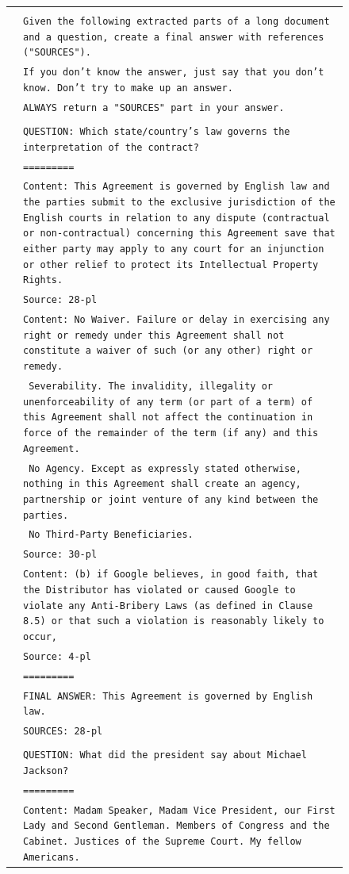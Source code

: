 { %
\newcommand{\pWidth}{5in}
\newcommand{\pStart}{\setcounter{pCount}{1}}
\newcommand{\pRow}[1]{\texttt{\fontsize{6pt}{1pt}\selectfont\color{gray}\arabic{pCount}}&\texttt{\fontsize{6pt}{1pt}\selectfont#1}\stepcounter{pCount}\\}
\newcommand{\pVar}[1]{\textbf{\{#1\}}}
\newcommand{\pBlank}{\_\_\_\_\_}
\begin{figure}[p]
\label{fig:QA_with_sources_prompt}
\begin{center}\scriptsize
\begin{tabular}{|rp{\pWidth}|}\hline\pStart&\\
\pRow{Given the following extracted parts of a long document and a question, create a final answer with references ("SOURCES").}
\pRow{If you don't know the answer, just say that you don't know. Don't try to make up an answer.}
\pRow{ALWAYS return a "SOURCES" part in your answer.}
\pRow{}
\pRow{QUESTION: Which state/country's law governs the interpretation of the contract?}
\pRow{=========}
\pRow{Content: This Agreement is governed by English law and the parties submit to the exclusive jurisdiction of the English courts in  relation to any dispute (contractual or non-contractual) concerning this Agreement save that either party may apply to any court for an  injunction or other relief to protect its Intellectual Property Rights.}
\pRow{Source: 28-pl}
\pRow{Content: No Waiver. Failure or delay in exercising any right or remedy under this Agreement shall not constitute a waiver of such (or any other)  right or remedy.}
\pRow{11.7 Severability. The invalidity, illegality or unenforceability of any term (or part of a term) of this Agreement shall not affect the continuation  in force of the remainder of the term (if any) and this Agreement.}
\pRow{11.8 No Agency. Except as expressly stated otherwise, nothing in this Agreement shall create an agency, partnership or joint venture of any  kind between the parties.}
\pRow{11.9 No Third-Party Beneficiaries.}
\pRow{Source: 30-pl}
\pRow{Content: (b) if Google believes, in good faith, that the Distributor has violated or caused Google to violate any Anti-Bribery Laws (as  defined in Clause 8.5) or that such a violation is reasonably likely to occur,}
\pRow{Source: 4-pl}
\pRow{=========}
\pRow{FINAL ANSWER: This Agreement is governed by English law.}
\pRow{SOURCES: 28-pl}
\pRow{}
\pRow{QUESTION: What did the president say about Michael Jackson?}
\pRow{=========}
\pRow{Content: Madam Speaker, Madam Vice President, our First Lady and Second Gentleman. Members of Congress and the Cabinet. Justices of the Supreme Court. My fellow Americans.  }

\end{tabular}
\end{center}
\end{figure}}
